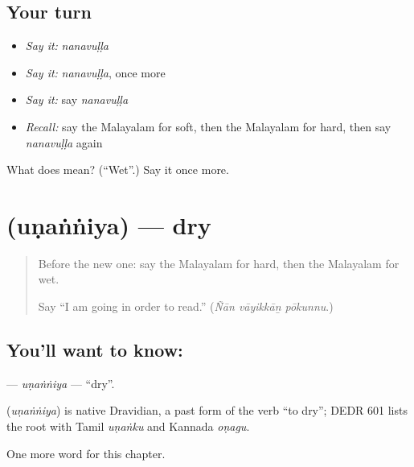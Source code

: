 \subsection*{Your turn}
\begin{itemize}
\raggedright
  \item \emph{Say it:} \emph{nanavuḷḷa}
  \item \emph{Say it:} \emph{nanavuḷḷa}, once more
  \item \emph{Say it:} say \emph{nanavuḷḷa}
  \item \emph{Recall:} say the Malayalam for soft, then the Malayalam for hard, then say \emph{nanavuḷḷa} again
\end{itemize}

\begin{tcolorbox}[breakable,colback=teal!4,colframe=teal!35!black,title={Before you move on}]
What does  mean? (\textquotedblleft{}Wet\textquotedblright{}.) Say it once more.
\end{tcolorbox}
\section[\texorpdfstring{\ml{ഉണങ്ങിയ} (uṇaṅṅiya)}{ഉണങ്ങിയ (uṇaṅṅiya)}]{ (uṇaṅṅiya) — dry}

\label{lesson:ML-C167-unanniya}



\begin{quote}
Before the new one: say the Malayalam for hard, then the Malayalam for wet.

Say \textquotedblleft{}I am going in order to read.\textquotedblright{} (\emph{Ñān vāyikkāṉ pōkunnu}.)
\end{quote}

\subsection*{You'll want to know: }
\textbf{} — \emph{uṇaṅṅiya} — \textquotedblleft{}dry\textquotedblright{}.

\begin{cousinweb}
\textbf{} (\emph{uṇaṅṅiya}) is native Dravidian, a past form of the verb \textquotedblleft{}to dry\textquotedblright{}; DEDR 601 lists the root with Tamil \emph{uṇaṅku} and Kannada \emph{oṇagu}.
\end{cousinweb}

\begin{grammarlens}[title={What you've built}]
One more word for this chapter.
\end{grammarlens}

